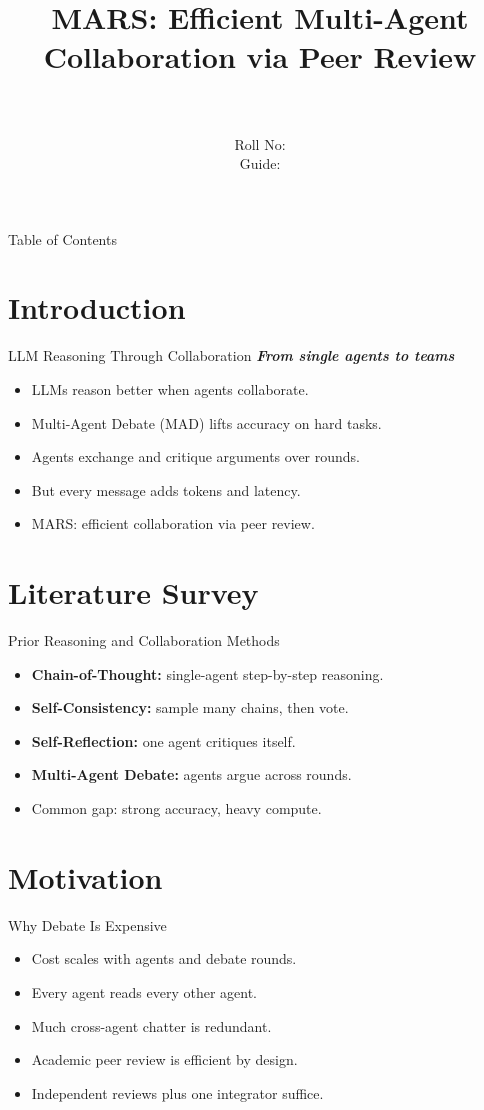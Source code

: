 \documentclass{beamer}
\title[\seminarShortTitle]{MARS: Efficient Multi-Agent Collaboration via Peer Review}
\author[\seminarName\ (\seminarShortCollege)]{\seminarName \\ \seminarRoll \\ Roll No: \seminarClassRoll \\ Guide: \seminarGuide}
\institute[\seminarShortCollege]{\seminarDept \\ \seminarCollege}
\date{\seminarDate}
\begin{document}
\begin{frame}\titlepage\end{frame}
\begin{frame}{Table of Contents}\tableofcontents\end{frame}
\section{Introduction}
\begin{frame}{LLM Reasoning Through Collaboration}
\textbf{\textit{From single agents to teams}}
\begin{itemize}
\item LLMs reason better when agents collaborate.
\item Multi-Agent Debate (MAD) lifts accuracy on hard tasks.
\item Agents exchange and critique arguments over rounds.
\item But every message adds tokens and latency.
\item MARS: efficient collaboration via peer review.
\end{itemize}
\end{frame}

\section{Literature Survey}
\begin{frame}{Prior Reasoning and Collaboration Methods}
\begin{itemize}
\item \textbf{Chain-of-Thought:} single-agent step-by-step reasoning.
\item \textbf{Self-Consistency:} sample many chains, then vote.
\item \textbf{Self-Reflection:} one agent critiques itself.
\item \textbf{Multi-Agent Debate:} agents argue across rounds.
\item Common gap: strong accuracy, heavy compute.
\end{itemize}
\end{frame}

\section{Motivation}
\begin{frame}{Why Debate Is Expensive}
\begin{itemize}
\item Cost scales with agents and debate rounds.
\item Every agent reads every other agent.
\item Much cross-agent chatter is redundant.
\item Academic peer review is efficient by design.
\item Independent reviews plus one integrator suffice.
\end{itemize}
\end{frame}
\end{document}
